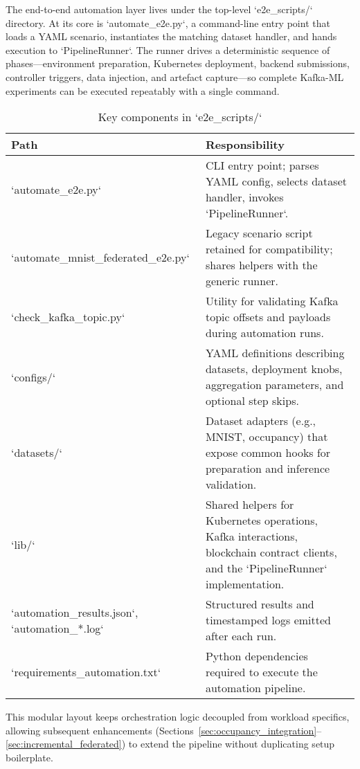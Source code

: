The end-to-end automation layer lives under the top-level `e2e\_scripts/` directory. At its core is `automate\_e2e.py`, a command-line entry point that loads a YAML scenario, instantiates the matching dataset handler, and hands execution to `PipelineRunner`. The runner drives a deterministic sequence of phases—environment preparation, Kubernetes deployment, backend submissions, controller triggers, data injection, and artefact capture—so complete Kafka-ML experiments can be executed repeatably with a single command.

\begin{table}[h!]
    \centering
    \caption{Key components in `e2e\_scripts/`}
    \label{tab:e2e_components}
    \begin{tabular}{p{} p{}}
        \toprule
        \textbf{Path} & \textbf{Responsibility} \\
        \midrule
        `automate\_e2e.py` & CLI entry point; parses YAML config, selects dataset handler, invokes `PipelineRunner`. \\
        `automate\_mnist_federated_e2e.py` & Legacy scenario script retained for compatibility; shares helpers with the generic runner. \\
        `check_kafka_topic.py` & Utility for validating Kafka topic offsets and payloads during automation runs. \\
        `configs/` & YAML definitions describing datasets, deployment knobs, aggregation parameters, and optional step skips. \\
        `datasets/` & Dataset adapters (e.g., MNIST, occupancy) that expose common hooks for preparation and inference validation. \\
        `lib/` & Shared helpers for Kubernetes operations, Kafka interactions, blockchain contract clients, and the `PipelineRunner` implementation. \\
        `automation_results.json`, `automation_*.log` & Structured results and timestamped logs emitted after each run. \\
        `requirements_automation.txt` & Python dependencies required to execute the automation pipeline. \\
    \bottomrule
    \end{tabular}
\end{table}

This modular layout keeps orchestration logic decoupled from workload specifics, allowing subsequent enhancements (Sections~\ref{sec:occupancy_integration}--\ref{sec:incremental_federated}) to extend the pipeline without duplicating setup boilerplate.

